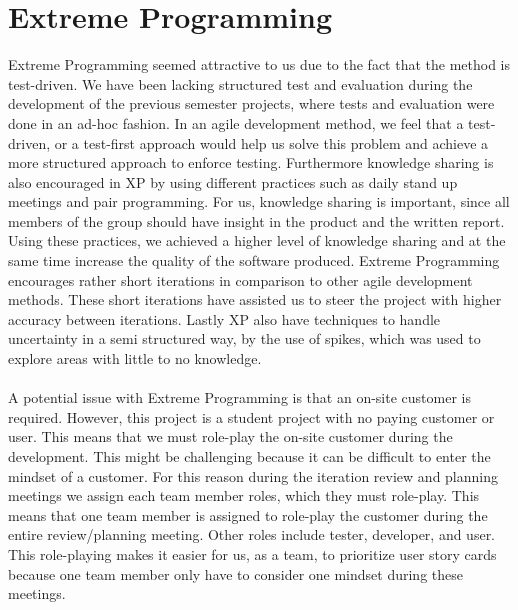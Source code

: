 
\section{Extreme Programming}
\label{sec:extreme_programming}

Extreme Programming seemed attractive to us due to the fact that the method is test-driven. We have been lacking structured test and evaluation during the development of the previous semester projects, where tests and evaluation were done in an ad-hoc fashion. In an agile development method, we feel that a test-driven, or a test-first approach would help us solve this problem and achieve a more structured approach to enforce testing. Furthermore knowledge sharing is also encouraged in XP by using different practices such as daily stand up meetings and pair programming. For us, knowledge sharing is important, since all members of the group should have insight in the product and the written report. Using these practices, we achieved a higher level of knowledge sharing and at the same time increase the quality of the software produced. Extreme Programming encourages rather short iterations in comparison to other agile development methods. These short iterations have assisted us to steer the project with higher accuracy between iterations. Lastly XP also have techniques to handle uncertainty in a semi structured way, by the use of spikes, which was used to explore areas with little to no knowledge. 
\\\\
A potential issue with Extreme Programming is that an on-site customer is required. However, this project is a student project with no paying customer or user. This means that we must role-play the on-site customer during the development. This might be challenging because it can be difficult to enter the mindset of a customer. For this reason during the iteration review and planning meetings we assign each team member roles, which they must role-play. This means that one team member is assigned to role-play the customer during the entire review/planning meeting. Other roles include tester, developer, and user. This role-playing makes it easier for us, as a team, to prioritize user story cards because one team member only have to consider one mindset during these meetings.

